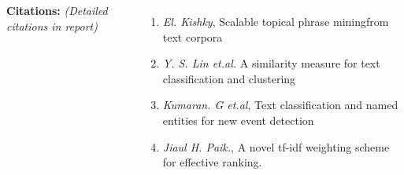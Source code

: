 \documentclass[17pt, a1paper, landscape, margin=0mm, innermargin=15mm,
blockverticalspace=15mm, colspace=15mm, subcolspace=8mm]{tikzposter}
\begin{document}
\begin{columns}
{\textbf{\Large{Citations:}} \textit{(Detailed citations in report)}
\begin{enumerate}
        \item \textit{El. Kishky}, Scalable topical phrase miningfrom text corpora
        \item \textit{Y. S. Lin et.al.} A similarity measure for text classification and clustering 
        \item \textit{Kumaran. G et.al}, Text classification and named entities for new event detection
        \item \textit{Jiaul H. Paik.}, A novel tf-idf weighting scheme for effective ranking.
\end{enumerate}
}




\end{columns}


{

}
\end{document}
